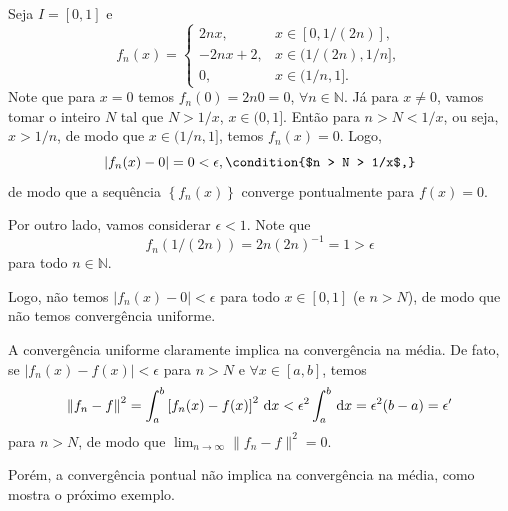\begin{exem}
  Seja $I = [0, 1]$ e
  \begin{dmath*}
    f_n(x) = \begin{cases}
      2 n x, & x \in [0, 1 / (2n)], \\
      -2 n x + 2, & x \in (1 / (2n), 1 / n], \\
      0, & x \in (1 / n, 1].
    \end{cases}
  \end{dmath*}
  Note que para $x = 0$ temos $f_n(0) = 2 n 0 = 0$, $\forall n \in \mathbb{N}$.
  Já para $x \neq 0$, vamos tomar o inteiro $N$ tal que $N > 1 / x$, $x \in (0,
  1]$. Então para $n > N < 1 / x$, ou seja, $x > 1 / n$, de modo que $x \in
  (1/n, 1]$, temos $f_n(x) = 0$. Logo,
  \begin{dmath*}
    | f_n(x) - 0 | = 0 < \epsilon, \condition{$n > N > 1/x$,}
  \end{dmath*}
  de modo que a sequência $\left\{ f_n(x) \right\}$ converge pontualmente para
  $f(x) = 0$.

  Por outro lado, vamos considerar $\epsilon < 1$. Note que
  \begin{dmath*}
    f_n\left( 1/\left( 2n \right) \right) = 2 n \left( 2 n \right)^{-1}
    = 1
    > \epsilon
  \end{dmath*}
  para todo $n \in \mathbb{N}$.

  Logo, não temos $| f_n(x) - 0 | < \epsilon$ para todo $x \in [0,1]$ (e $n >
  N$), de modo que não temos convergência uniforme.
\end{exem}

A convergência uniforme claramente implica na convergência na média. De fato, se
$| f_n(x) - f(x) | < \epsilon$ para $n > N$ e $\forall x \in [a,b]$, temos
\begin{dmath*}
  \left\| f_n - f \right\|^2 = \int_a^b \left[ f_n(x) - f(x) \right]^2 \vi{x} < \epsilon^2
  \int_a^b \vi{x} = \epsilon^2 (b - a) = \epsilon'
\end{dmath*}
para $n > N$, de modo que $\lim_{n \to \infty} \| f_n - f \|^2 = 0$.

Porém, a convergência pontual não implica na convergência na média, como mostra
o próximo exemplo.

